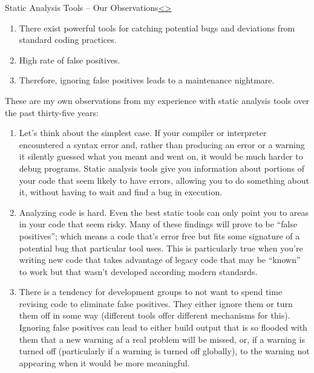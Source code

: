 \documentclass[12pt]{extarticle}
\newenvironment{instructionblock}{\Large\bgroup}{\egroup}
\begin{document}


\pagebreak
\begin{slide}{Static Analysis Tools -- Our Observations}{\hyperref[slide 10]{\textless}\hyperref[slide 12]{\textgreater}}
	\vskip 10pt
	\begin{instructionblock}
	\begin{enumerate}
	\item There exist powerful tools for catching potential bugs and deviations from standard coding practices.
	\item High rate of false positives.
	\item Therefore, ignoring false positives leads to a maintenance nightmare.
	\end{enumerate}
	\end{instructionblock}
\end{slide}
\noindent
These are my own observations from my experience with static analysis tools over the past thirty-five years:
\begin{enumerate}
\item Let's think about the simplest case. If your compiler or interpreter encountered a syntax error and, rather than producing an error or a warning it silently guessed what you meant and went on, it would be much harder to debug programs.  Static analysis tools give you information about portions of your code that seem likely to have errors, allowing you to do something about it, without having to wait and find a bug in execution.
\item Analyzing code is hard.  Even the best static tools can only point you to areas in your code that seem risky.  Many of these findings will prove to be ``false positives''; which means a code that's error free but fits some signature of a potential bug that particular tool uses.  This is particularly true when you're writing new code that takes advantage of legacy code that may be ``known'' to work but that wasn't developed according modern standards.
\item There is a tendency for development groups to not want to spend time revising code to eliminate false positives.  They either ignore them or turn them off in some way (different tools offer different mechanisms for this).  Ignoring false positives can lead to either build output that is so flooded with them that a new warning af a real problem will be missed, or, if a warning is turned off (particularly if a warning is turned off globally), to the warning not appearing when it would be more meaningful.
\end{enumerate}
\end{document}

